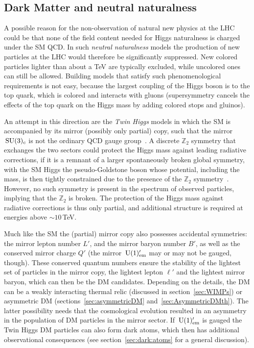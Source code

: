 \subsection{Dark Matter and neutral naturalness}\label{sec:neutral:naturalness}
A possible reason for the non-observation of natural new physics at the LHC 
could be that none of the field content needed for Higgs naturalness is charged under the SM QCD. 
In such  {\em neutral naturalness} models the production of new particles at the LHC would therefore be significantly suppressed. 
New colored particles lighter than about a TeV are typically excluded, while uncolored ones can still be allowed.
Building models that satisfy such phenomenological requirements is not easy, 
because the largest coupling of the Higgs boson is to the top quark,
which is colored and interacts with gluons (supersymmetry cancels the effects of the top quark on the Higgs mass by adding colored stops and gluinos).


An attempt in this direction are the {\em Twin Higgs} models in which the SM is accompanied by its mirror (possibly only partial) copy,
such that the mirror $\,{\rm SU}(3)_c$ is not the ordinary QCD gauge group~\cite{Neutral:naturalness}.
A discrete $\mathbb{Z}_2$ symmetry that exchanges the two sectors could protect the Higgs mass against leading radiative corrections, 
if it is a remnant of a larger spontaneously broken global symmetry, with the SM Higgs the pseudo-Goldstone boson whose potential, including the mass, is then tightly constrained due to the presence of the $\mathbb{Z}_2$ symmetry~\cite{Neutral:naturalness}. 
However, no such symmetry is present in the spectrum of observed particles, implying that the $\mathbb{Z}_2$ is broken. 
The protection of the Higgs mass against radiative corrections is thus only partial, and additional structure is required at energies above $\sim 10$\,TeV. 

Much like the SM the (partial) mirror copy also possesses accidental symmetries: the mirror lepton number $L'$, and the mirror baryon number $B'$, as well as the conserved  mirror charge $Q'$ 
(the mirror $\,{\rm U}(1)'_{\rm em}$ may or may not be gauged, though). 
These conserved quantum numbers ensure the stability of the lightest set of particles in the mirror copy, the lightest lepton $\ell'$ and the lightest mirror baryon, 
which can then be the DM candidates. 
Depending on the details, the DM can be a weakly interacting thermal relic (discussed in section~\ref{sec:WIMPs})
or asymmetric DM (sections~\ref{sec:asymmetricDM} and~\ref{sec:AsymmetricDMth}).
The latter possibility needs that the cosmological evolution resulted in an asymmetry in the population of DM particles in the mirror sector. 
If $\,{\rm U}(1)'_{\rm em}$ is gauged the Twin Higgs DM particles can also form dark atoms, which then has additional observational consequences (see section~\ref{sec:dark:atoms} for a general discussion). 





